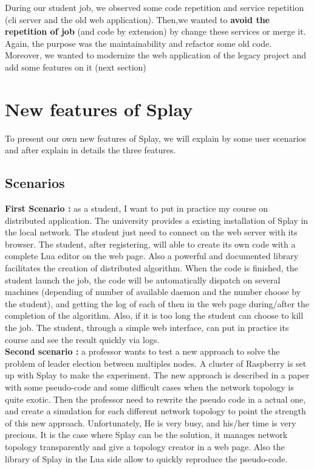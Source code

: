 \documentclass{eplmastersthesis}
\begin{document}
      During our student job, we observed some code repetition and service
      repetition (cli server and the old web application). Then,we wanted
      to \textbf{avoid the repetition of job} (and code by extension) by
      change these services or merge it. Again, the purpose was the
      maintainability and refactor some old code. Moreover, we wanted to
      modernize the web application of the legacy project and add some
      features on it (next section)


    \section{New features of Splay} %

     To present our own new features of Splay, we will explain by some user
     scenarios and after explain in details the three features.

      \subsection{Scenarios} %

        \textbf{First Scenario : } as a student, I want to put in practice my
        course on distributed application. The university provides a existing
        installation of Splay in the local network. The student just need to
        connect on the web server with its browser. The student, after
        registering, will able to create its own code with a complete Lua
        editor on the web page. Also a powerful and documented library
        facilitates the creation of distributed algorithm. When the code is
        finished, the student launch the job, the code will be automatically
        dispatch on several machines (depending of number of available daemon
        and the number choose by the student), and getting the log of each of
        then in the web page during/after the completion of the algorithm.
        Also, if it is too long the student can choose to kill the job. The
        student, through a simple web interface, can put in practice its course
        and see the result quickly via logs.\\

      	\textbf{Second scenario : } a professor wants to test a new approach to
        solve the problem of leader election between multiples nodes. A cluster
        of Raspberry is set up with Splay to make the experiment. The new
        approach is described in a paper with some pseudo-code and some difficult
        cases when the network topology is quite exotic. Then the professor need
        to rewrite the pseudo code in a actual one, and create a simulation for
        each different network topology to point the strength of this new
        approach. Unfortunately, He is very busy, and his/her time is very
        precious. It is the case where Splay can be the solution, it manages
        network topology transparently and give a topology creator in a web page.
        Also the library of Splay in the Lua side allow to quickly reproduce the
        pseudo-code.
\end{document}

